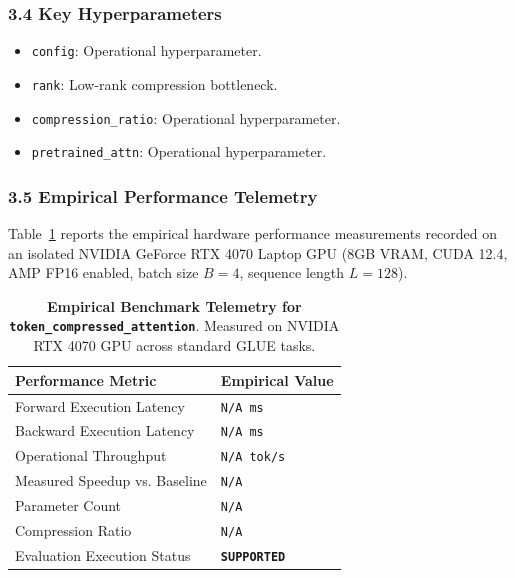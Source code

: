 \subsubsection*{3.4 Key Hyperparameters}
\begin{itemize}
    \item \texttt{config}: Operational hyperparameter.
    \item \texttt{rank}: Low-rank compression bottleneck.
    \item \texttt{compression\_ratio}: Operational hyperparameter.
    \item \texttt{pretrained\_attn}: Operational hyperparameter.
\end{itemize}

\subsubsection*{3.5 Empirical Performance Telemetry}
Table~\ref{tab:telemetry_token\_compressed\_attention} reports the empirical hardware performance measurements recorded on an isolated NVIDIA GeForce RTX 4070 Laptop GPU (8GB VRAM, CUDA 12.4, AMP FP16 enabled, batch size $B=4$, sequence length $L=128$).

\begin{table}[h]
\centering
\small
\caption{\textbf{Empirical Benchmark Telemetry for \texttt{token\_compressed\_attention}}. Measured on NVIDIA RTX 4070 GPU across standard GLUE tasks.}
\label{tab:telemetry_token\_compressed\_attention}
\begin{tabularx}{\columnwidth}{lX}
\toprule
\textbf{Performance Metric} & \textbf{Empirical Value} \\
\midrule
Forward Execution Latency & \texttt{N/A ms} \\
Backward Execution Latency & \texttt{N/A ms} \\
Operational Throughput & \texttt{N/A tok/s} \\
Measured Speedup vs. Baseline & \texttt{N/A} \\
Parameter Count & \texttt{N/A} \\
Compression Ratio & \texttt{N/A} \\
Evaluation Execution Status & \textbf{\texttt{SUPPORTED}} \\
\bottomrule
\end{tabularx}
\end{table}

